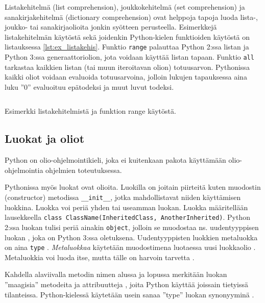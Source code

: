 \documentclass[finnish]{tktltiki2}
\theoremstyle{definition}
\theoremstyle{remark}
\begin{document}
Listakehitelmä (list comprehension), joukkokehitelmä (set comprehension) ja sanakirjakehitelmä (dictionary comprehension) ovat helppoja tapoja luoda lista-, joukko- tai sanakirjaolioita jonkin syötteen perusteella. Esimerkkejä listakehitelmän käytöstä sekä joidenkin Python-kielen funktioiden käytöstä on listauksessa \ref{lst:ex_listakehis}. Funktio \verb|range| palauttaa Python 2:ssa listan ja Python 3:ssa generaattoriolion, jota voidaan käyttää listan tapaan. Funktio \verb|all| tarkastaa kaikkien listan (tai muun iteroitavan olion) totuusarvon. Pythonissa kaikki oliot voidaan evaluoida totuusarvoina, jolloin lukujen tapauksessa aina luku ''0'' evaluoituu epätodeksi ja muut luvut todeksi.

\begin{listing}
    \inputminted[linenos]{python}{code/luvut.py}
    \caption{Esimerkki listakehitelmistä ja funktion range käytöstä.}
    \label{lst:ex_listakehis}
\end{listing}


\subsection{Luokat ja oliot}

Python on olio-ohjelmointikieli, joka ei kuitenkaan pakota käyttämään olio-ohjelmointia ohjelmien toteutuksessa. 

Pythonissa myös luokat ovat olioita. Luokilla on joitain piirteitä kuten muodostin (constructor) metodissa \verb|__init__|, jotka mahdollistavat niiden käyttämisen luokkina. Luokka voi periä yhden tai useamman luokan. Luokka määritellään lausekkeella \verb|class ClassName(InheritedClass, AnotherInherited)|. Python 2:ssa luokan tulisi periä ainakin \verb|object|, jolloin se muodostaa ns. uudentyyppisen luokan \cite{martelli2006python}, joka on Python 3:ssa oletuksena. Uudentyyppisten luokkien metaluokka on aina \verb|type| \cite{martelli2006python}. \emph{Metaluokkaa} käytetään muodostimena luotaessa uusi luokkaolio \cite{python3meta}. Metaluokkia voi luoda itse, mutta tälle on harvoin tarvetta \cite{python3meta}.

Kahdella alaviivalla metodin nimen alussa ja lopussa merkitään luokan ''maagisia'' metodeita ja attribuutteja \cite{martelli2006python}, joita Python käyttää joissain tietyissä tilanteissa. Python-kielessä käytetään usein sanaa ''type'' luokan synonyyminä \cite{python3meta}.

\end{document}
